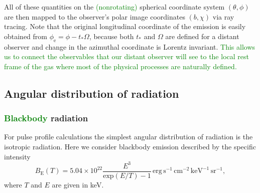 \documentclass{aa}
\newcommand{\refe}[1]{\textcolor{green}{{#1}}}
\newcommand{\refedel}[1]{}
\begin{document}
All of these quantities on the \refe{(nonrotating)}\refedel{ star's} spherical coordinate system $(\theta, \phi)$ are then mapped to the observer's polar image coordinates $(b, \chi)$ via ray tracing.
Note that the original longitudinal coordinate of the emission is easily obtained from $\phi_{\mathrm{e}} = \phi - t_* \Omega$, because both $t_*$ and $\Omega$ are defined for a distant observer and change in the azimuthal coordinate is Lorentz invariant.
\refe{This allows us to connect the observables that our distant observer will see to the local rest frame of the gas where most of the physical processes are naturally defined.}

\refedel{
This ends our discussion of ray tracing from the image plane to the star.
In many ways, it is the more intuitive direction, even though the time coordinate is propagated backwards, because it forces us to think from the point of view of the observer.
}



\subsection{Angular distribution of radiation}\label{sect:angular_distr}
\subsubsection{\refe{Blackbody} radiation}

For pulse profile calculations the simplest angular distribution of radiation is the isotropic radiation.
Here we consider blackbody emission described by the specific intensity
\begin{equation}
  B_{\mathrm{E}}(T) = 5.04 \times 10^{22} \frac{E^3}{\mathrm{exp}(E/T) -1} \,\mathrm{erg}\,\mathrm{s}^{-1}\,\mathrm{cm}^{-2}\,\mathrm{keV}^{-1}\,\mathrm{sr}^{-1},
\end{equation}
where $T$ and $E$ are given in keV.
\refedel{The radiation is isotropic and there is no dependence on the angle $\alpha'=\cos^{-1}\mu'$, measured relative to the surface normal by the co-rotating observer.}
\end{document}

